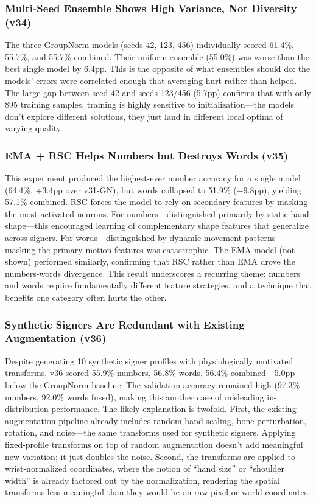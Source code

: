 \documentclass[conference]{IEEEtran}
\begin{document}
\subsubsection{Multi-Seed Ensemble Shows High Variance, Not Diversity (v34)}
The three GroupNorm models (seeds 42, 123, 456) individually scored 61.4\%, 55.7\%, and 55.7\% combined. Their uniform ensemble (55.0\%) was worse than the best single model by 6.4pp. This is the opposite of what ensembles should do: the models' errors were correlated enough that averaging hurt rather than helped. The large gap between seed 42 and seeds 123/456 (5.7pp) confirms that with only 895 training samples, training is highly sensitive to initialization---the models don't explore different solutions, they just land in different local optima of varying quality.

\subsubsection{EMA + RSC Helps Numbers but Destroys Words (v35)}
This experiment produced the highest-ever number accuracy for a single model (64.4\%, +3.4pp over v31-GN), but words collapsed to 51.9\% ($-$9.8pp), yielding 57.1\% combined. RSC forces the model to rely on secondary features by masking the most activated neurons. For numbers---distinguished primarily by static hand shape---this encouraged learning of complementary shape features that generalize across signers. For words---distinguished by dynamic movement patterns---masking the primary motion features was catastrophic. The EMA model (not shown) performed similarly, confirming that RSC rather than EMA drove the numbers-words divergence. This result underscores a recurring theme: numbers and words require fundamentally different feature strategies, and a technique that benefits one category often hurts the other.

\subsubsection{Synthetic Signers Are Redundant with Existing Augmentation (v36)}
Despite generating 10 synthetic signer profiles with physiologically motivated transforms, v36 scored 55.9\% numbers, 56.8\% words, 56.4\% combined---5.0pp below the GroupNorm baseline. The validation accuracy remained high (97.3\% numbers, 92.0\% words fused), making this another case of misleading in-distribution performance. The likely explanation is twofold. First, the existing augmentation pipeline already includes random hand scaling, bone perturbation, rotation, and noise---the same transforms used for synthetic signers. Applying fixed-profile transforms on top of random augmentation doesn't add meaningful new variation; it just doubles the noise. Second, the transforms are applied to wrist-normalized coordinates, where the notion of ``hand size'' or ``shoulder width'' is already factored out by the normalization, rendering the spatial transforms less meaningful than they would be on raw pixel or world coordinates.
\end{document}
